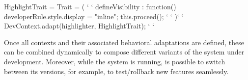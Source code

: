 \vspace{-3.5ex}
\begin{ctxtraits}[numbers=left]
 HighlightTrait = Trait = ({ ` \label{ln:ba-init} `
   defineVisibility : function() {
     developerRule.style.display = "inline";
     this.proceed();  `\label{ln:proceed} `
   }
 })` \label{ln:ba-end} `
 DevContext.adapt(highlighter, HighlightTrait); ` \label{ln:association} `
\end{ctxtraits}
\vspace{-4ex}

Once all contexts and their associated behavioral adaptations are defined, these can be combined 
dynamically to compose different variants of the system under development. Moreover, while the 
system is running, is possible to switch between its versions, for example, to test/rollback new 
features seamlessly. 

\endinput
